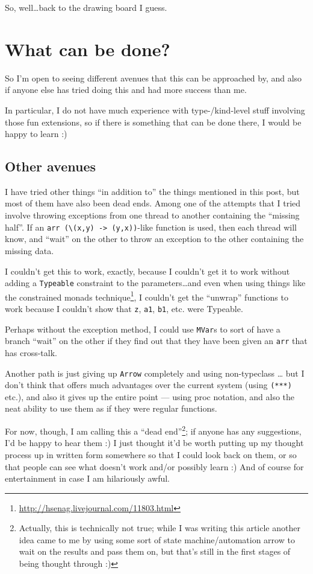 \documentclass[]{article}
\renewcommand{\href}[2]{#2\footnote{\url{#1}}}
\begin{document}
So, well\ldots back to the drawing board I guess.

\section{What can be done?}\label{what-can-be-done}

So I'm open to seeing different avenues that this can be approached by, and also
if anyone else has tried doing this and had more success than me.

In particular, I do not have much experience with type-/kind-level stuff
involving those fun extensions, so if there is something that can be done there,
I would be happy to learn :)

\subsection{Other avenues}\label{other-avenues}

I have tried other things ``in addition to'' the things mentioned in this post,
but most of them have also been dead ends. Among one of the attempts that I
tried involve throwing exceptions from one thread to another containing the
``missing half''. If an
\texttt{arr\ (\textbackslash{}(x,y)\ -\textgreater{}\ (y,x))}-like function is
used, then each thread will know, and ``wait'' on the other to throw an
exception to the other containing the missing data.

I couldn't get this to work, exactly, because I couldn't get it to work without
adding a \texttt{Typeable} constraint to the parameters\ldots and even when
using things like the
\href{http://hsenag.livejournal.com/11803.html}{constrained monads technique}, I
couldn't get the ``unwrap'' functions to work because I couldn't show that
\texttt{z}, \texttt{a1}, \texttt{b1}, etc. were Typeable.

Perhaps without the exception method, I could use \texttt{MVar}s to sort of have
a branch ``wait'' on the other if they find out that they have been given an
\texttt{arr} that has cross-talk.

Another path is just giving up \texttt{Arrow} completely and using non-typeclass
\ldots{} but I don't think that offers much advantages over the current system
(using \texttt{(***)} etc.), and also it gives up the entire point --- using
proc notation, and also the neat ability to use them as if they were regular
functions.

For now, though, I am calling this a ``dead end''\footnote{Actually, this is
  technically not true; while I was writing this article another idea came to me
  by using some sort of state machine/automation arrow to wait on the results
  and pass them on, but that's still in the first stages of being thought
  through :)}; if anyone has any suggestions, I'd be happy to hear them :) I
just thought it'd be worth putting up my thought process up in written form
somewhere so that I could look back on them, or so that people can see what
doesn't work and/or possibly learn :) And of course for entertainment in case I
am hilariously awful.
\end{document}
